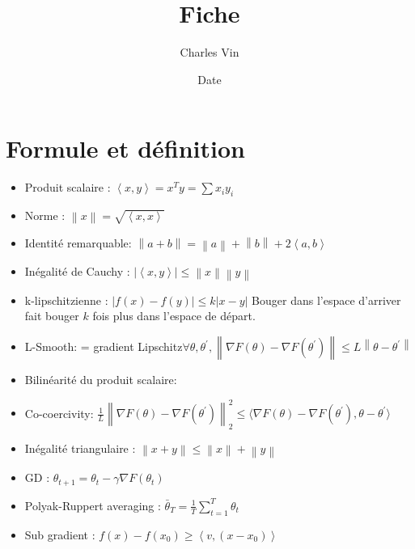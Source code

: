 \documentclass{article}
\title{Fiche}
\author{Charles Vin}
\date{Date}
\theoremstyle{plain}%
\theoremstyle{definition}
\theoremstyle{remark}
\begin{document}
\maketitle

\section{Formule et définition}
\begin{itemize}
    \item Produit scalaire : $ \left\langle x, y \right\rangle = x^T y = \sum x_i y_i $ 
    \item Norme : $ \left\| x \right\| = \sqrt{\left\langle x,x \right\rangle } $ 
    \item Identité remarquable: $ \left\| a + b \right\| = \left\| a \right\| + \left\| b \right\| + 2 \left\langle a,b \right\rangle  $ 
    \item Inégalité de Cauchy : $ \left| \left\langle x,y \right\rangle  \right| \leq \left\| x \right\| \left\| y \right\|   $ 
    \item k-lipschitzienne : $ \left| f(x) - f(y) \right| \leq k \left| x - y \right|  $ Bouger dans l'espace d'arriver fait bouger $ k $ fois plus dans l'espace de départ.
    \item L-Smooth: = gradient Lipschitz$ \forall \theta , \theta ^\prime, \left\| \nabla F(\theta ) - \nabla F(\theta ^\prime ) \right\| \leq  L \left\| \theta - \theta ^\prime  \right\| $ 
    \item Bilinéarité du produit scalaire: 
    \item Co-coercivity: $ \frac{1}{L} \left\| \nabla F(\theta ) - \nabla F(\theta ^\prime ) \right\| ^2 _2 \leq  \langle  \nabla F(\theta ) - \nabla F(\theta ^\prime ), \theta  - \theta ^\prime \rangle$ 
    \item Inégalité triangulaire : $ \left\| x + y \right\| \leq \left\| x \right\| + \left\| y \right\|  $ 
    \item GD : $ \theta _{t+1} = \theta _t - \gamma \nabla F(\theta _t) $ 
    \item Polyak-Ruppert averaging : $ \bar{\theta }_T = \frac{1}{T} \sum_{t=1}^{T}\theta _t $ 
    \item Sub gradient : $ f(x) - f(x_0) \geq \left\langle v, (x - x_0) \right\rangle  $ 
\end{itemize}
\end{document}
